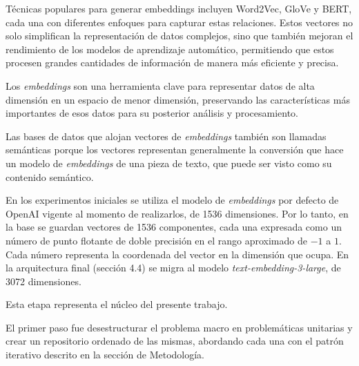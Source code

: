 Técnicas populares para generar embeddings incluyen Word2Vec, GloVe y BERT, cada una con diferentes enfoques para capturar estas relaciones. Estos vectores no solo simplifican la representación de datos complejos, sino que también mejoran el rendimiento de los modelos de aprendizaje automático, permitiendo que estos procesen grandes cantidades de información de manera más eficiente y precisa.

Los \textit{embeddings} son una herramienta clave para representar datos de alta dimensión en un espacio de menor dimensión, preservando las características más importantes de esos datos para su posterior análisis y procesamiento.

Las bases de datos que alojan vectores de \textit{embeddings} también son llamadas semánticas porque los vectores representan generalmente la conversión que hace un modelo de \textit{embeddings} de una pieza de texto, que puede ser visto como su contenido semántico.

En los experimentos iniciales se utiliza el modelo de \textit{embeddings} por defecto de OpenAI vigente al momento de realizarlos, de 1536 dimensiones. Por lo tanto, en la base se guardan vectores de 1536 componentes, cada una expresada como un número de punto flotante de doble precisión en el rango aproximado de $-1$ a $1$. Cada número representa la coordenada del vector en la dimensión que ocupa. En la arquitectura final (sección 4.4) se migra al modelo \textit{text-embedding-3-large}, de 3072 dimensiones.

Esta etapa representa el núcleo del presente trabajo.

El primer paso fue desestructurar el problema macro en problemáticas unitarias y crear un repositorio ordenado de las mismas, abordando cada una con el patrón iterativo descrito en la sección de Metodología.